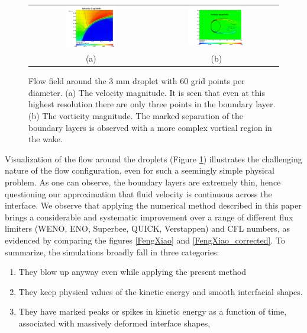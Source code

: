 \begin{figure}[!h]
\begin{center}
\begin{tabular}{cc}
\includegraphics[width=0.42\textwidth]{Figures/vel.png}
& \includegraphics[width=0.48\textwidth]{Figures/vort.png} \\
(a) & (b)
\end{tabular}
\end{center}
\caption{Flow field around the 3 mm droplet with 60 grid points per diameter. 
(a) The velocity magnitude. It is seen that even at this highest resolution 
there are only three points in the boundary layer. (b) The vorticity magnitude. 
The marked separation of the boundary layers is observed with 
a more complex vortical region in the wake.}
\label{magn}
\end{figure}
\newcommand\DDD{{\cal D}}

Visualization of the flow around the droplets (Figure \ref{magn}) illustrates the challenging nature of the flow configuration, even for such a seemingly simple physical problem. As one can observe, the boundary layers are extremely thin, hence questioning our approximation that fluid velocity is continuous across the interface. We observe that applying the numerical method described in this paper brings a considerable and systematic improvement over a range of different flux limiters (WENO, ENO, Superbee, QUICK, Verstappen) and CFL numbers, as evidenced by comparing the figures \ref{FengXiao} and \ref{FengXiao_corrected}. To summarize, the simulations broadly fall in three categories: 

\begin{enumerate}
	\item They blow up anyway even while applying the present method
	\item They keep physical values of the kinetic energy and smooth interfacial shapes.
	\item They have marked peaks or spikes in kinetic energy as a function of time, associated with massively deformed interface shapes, 
\end{enumerate}

